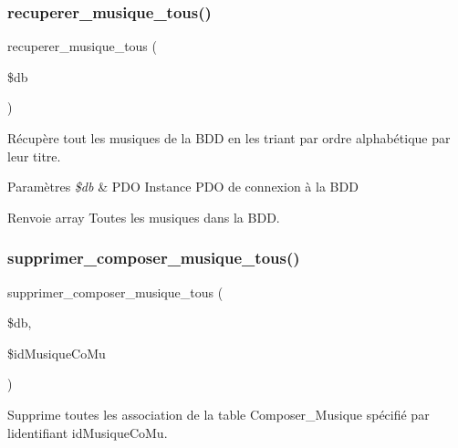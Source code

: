 \subsubsection{\texorpdfstring{recuperer\+\_\+musique\+\_\+tous()}{recuperer\_musique\_tous()}}
{\footnotesize\ttfamily recuperer\+\_\+musique\+\_\+tous (\begin{DoxyParamCaption}\item[{}]{\$db }\end{DoxyParamCaption})}



Récupère tout les musiques de la B\+DD en les triant par ordre alphabétique par leur titre. 


\begin{DoxyParams}{Paramètres}
{\em \$db} & P\+DO Instance P\+DO de connexion à la B\+DD \\
\hline
\end{DoxyParams}
\begin{DoxyReturn}{Renvoie}
array Toutes les musiques dans la B\+DD. 
\end{DoxyReturn}
\mbox{\label{fonctionMusique_8php_a4522ce17fdee83b5a8a69cbd8793d8e8}} 
\subsubsection{\texorpdfstring{supprimer\+\_\+composer\+\_\+musique\+\_\+tous()}{supprimer\_composer\_musique\_tous()}}
{\footnotesize\ttfamily supprimer\+\_\+composer\+\_\+musique\+\_\+tous (\begin{DoxyParamCaption}\item[{}]{\$db,  }\item[{}]{\$id\+Musique\+Co\+Mu }\end{DoxyParamCaption})}



Supprime toutes les association de la table Composer\+\_\+\+Musique spécifié par l\textquotesingle{}identifiant \textquotesingle{}id\+Musique\+Co\+Mu\textquotesingle{}. 


